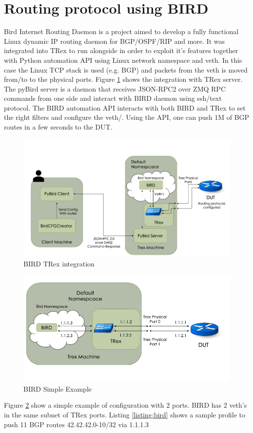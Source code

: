 \documentclass[letterpaper]{article}
\begin{document}
\section{Routing protocol using BIRD}

Bird Internet Routing Daemon \cite{b4} is a project aimed to develop a fully functional Linux dynamic IP routing daemon for BGP/OSPF/RIP and more. 
It was integrated into TRex to run alongside in order to exploit it’s features together with Python automation API using Linux network namespace and veth. 
In this case the Linux TCP stack is used (e.g. BGP) and packets from the veth is moved from/to to the physical ports. 
Figure \ref{fig:bird} shows the integration with TRex server. The pyBird server is a daemon that receives JSON-RPC2 over ZMQ RPC commands from one side and interact with BIRD daemon using ssh/text protocol. 
The BIRD automation API interacts with both BIRD and TRex to set the right filters and configure the veth/. Using the API, one can push 1M of BGP routes in a few seconds to the DUT.

\begin{figure}[h]
\includegraphics[width=0.5
\textwidth, center]{trex_bird_general_scheme.png}
\caption{BIRD TRex integration}
\label{fig:bird}
\end{figure}

\begin{figure}[h]
    \includegraphics[width=0.5
    \textwidth, center]{TRex_Bird_General_Scheme_With_ips.png}
    \caption{BIRD Simple Example}
    \label{fig:bird_example}
\end{figure}
  
    
Figure \ref{fig:bird_example} show a simple example of configuration with 2 ports. BIRD has 2 veth's in the same subnet of TRex ports. 
Listing \ref{listing:bird} shows a sample profile to push 11 BGP routes 42.42.42.0-10/32 via 1.1.1.3
\end{document}
